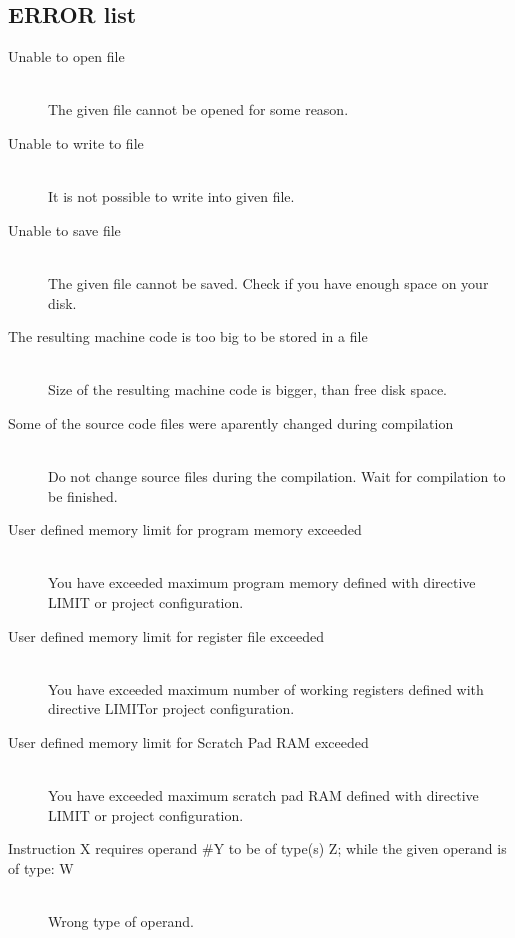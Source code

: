                 \subsection{ERROR list}
                    \begin{description}
                    \item[Unable to open file] \hfill \\
                    The given file cannot be opened for some reason.
                    \item[Unable to write to file] \hfill \\
                    It is not possible to write into given file.
                    \item[Unable to save file] \hfill \\
                    The given file cannot be saved. Check if you have enough space on your disk.
                    \item[The resulting machine code is too big to be stored in a file]\hfill \\
                    Size of the resulting machine code is bigger, than free disk space.
                    \item[Some of the source code files were aparently changed during compilation]\hfill \\
                    Do not change source files during the compilation. Wait for compilation to be finished.
                    \item[User defined memory limit for program memory exceeded]\hfill \\
                    You have exceeded maximum program memory defined with directive LIMIT or project configuration.
                    \item[User defined memory limit for register file exceeded]\hfill \\
                    You have exceeded maximum number of working registers defined with directive LIMITor project configuration.
                    \item[User defined memory limit for Scratch Pad RAM exceeded]\hfill \\
                    You have exceeded maximum scratch pad RAM defined with directive LIMIT or project configuration.
                    \item[Instruction X requires operand \#Y to be of type(s) Z; while the given operand is of type: W] \hfill \\   %
                    Wrong type of operand.

\end{description}

